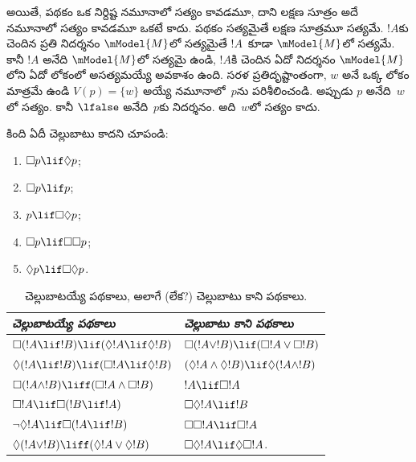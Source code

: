 \documentclass[../../../include/open-logic-section]{subfiles}
\begin{document}
అయితే, పథకం ఒక నిర్దిష్ట నమూనాలో సత్యం కావడమూ,
దాని లక్షణ సూత్రం అదే నమూనాలో సత్యం కావడమూ
ఒకటే కాదు.
పథకం సత్యమైతే లక్షణ సూత్రమూ సత్యమే.
$!A$కు చెందిన ప్రతి నిదర్శనం
$\mModel{M}$లో సత్యమైతే
$!A$~కూడా $\mModel{M}$లో సత్యమే.
కానీ $!A$ అనేది $\mModel{M}$లో
సత్యమై ఉండి, $!A$కి చెందిన ఏదో నిదర్శనం
$\mModel{M}$లోని ఏదో లోకంలో
అసత్యమయ్యే అవకాశం ఉంది. సరళ
ప్రతిదృష్టాంతంగా, $w$ అనే ఒక్క లోకం
మాత్రమే ఉండి $V(p) = \{w\}$
అయ్యే నమూనాలో~$p$ను పరిశీలించండి.
అప్పుడు $p$ అనేది~$w$లో సత్యం.
కానీ $\lfalse$ అనేది~$p$కు
నిదర్శనం. అది~$w$లో సత్యం కాదు.

\begin{prob}
  కింది 
  ఏదీ చెల్లుబాటు కాదని చూపండి:
  \begin{enumerate}
    \item[\Ax{D}:] \quad $\Box p \lif \Diamond p$;
    \item[\Ax{T}:] \quad $\Box p \lif p$;
    \item[\Ax{B}:] \quad $p \lif \Box\Diamond p$;
    \item[\Ax{4}:] \quad $\Box p \lif \Box \Box p$;
    \item[\Ax{5}:] \quad $\Diamond p \lif \Box \Diamond
      p$.
  \end{enumerate}
\end{prob}

\begin{table}[t]
    \centering
    \begin{tabular}{| l || l |}
      \hline
      {\emph{చెల్లుబాటయ్యే పథకాలు}} & {\emph{చెల్లుబాటు కాని పథకాలు}} \\
      \hline\hline
      $\Box(!A \lif !B) \lif (\Diamond !A \lif \Diamond !B)$
      & $\Box (!A \lor !B) \lif (\Box !A \lor \Box !B)$ \\
      $\Diamond (!A \lif !B) \lif (\Box !A \lif \Diamond
      !B)$
      & $(\Diamond !A \land \Diamond !B) \lif \Diamond (!A
      \land !B)$\\
      $\Box (!A \land !B) \liff (\Box !A \land \Box !B)$
      & $!A \lif \Box !A$ \\
      $\Box !A \lif \Box (!B \lif !A)$
      & $\Box \Diamond !A \lif !B$ \\
      $\lnot \Diamond !A \lif \Box (!A \lif !B)$
      & $\Box \Box !A \lif \Box !A$ \\
      $\Diamond (!A \lor !B) \liff (\Diamond !A \lor
      \Diamond !B)$
      & $\Box \Diamond !A \lif \Diamond \Box !A$. \\
      \hline
    \end{tabular}
    \caption{చెల్లుబాటయ్యే పథకాలు, అలాగే (లేక?) చెల్లుబాటు కాని పథకాలు.}
\end{table}
\end{document}
